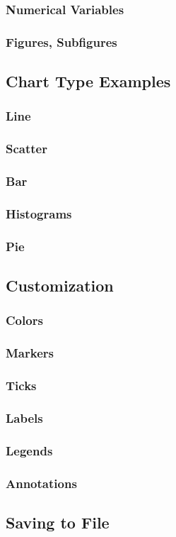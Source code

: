 \subsubsection{Numerical Variables}



\subsubsection{Figures, Subfigures}

\subsection{Chart Type Examples}

\subsubsection{Line}

\subsubsection{Scatter}

\subsubsection{Bar}

\subsubsection{Histograms}

\subsubsection{Pie}

\subsection{Customization}

\subsubsection{Colors}

\subsubsection{Markers}

\subsubsection{Ticks}

\subsubsection{Labels}

\subsubsection{Legends}

\subsubsection{Annotations}

\subsection{Saving to File}